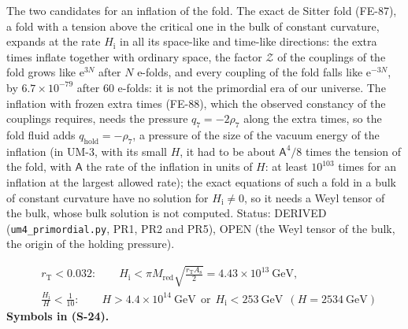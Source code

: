 \documentclass[
  10pt,
]{article}
\begin{document}
The two candidates for an inflation of the fold. The exact de Sitter
fold (FE-87), a fold with a tension above the critical one in the bulk
of constant curvature, expands at the rate \(H_{\mathrm{i}}\) in all its
space-like and time-like directions: the extra times inflate together
with ordinary space, the factor \(\mathcal{Z}\) of the couplings of the
fold grows like \(\mathrm{e}^{3N}\) after \(N\) e-folds, and every
coupling of the fold falls like \(\mathrm{e}^{-3N}\), by
\(6.7\times10^{-79}\) after 60 e-folds: it is not the primordial era of
our universe. The inflation with frozen extra times (FE-88), which the
observed constancy of the couplings requires, needs the pressure
\(q_7 = -2\rho_7\) along the extra times, so the fold fluid adds
\(q_{\mathrm{hold}} = -\rho_7\), a pressure of the size of the vacuum
energy of the inflation (in UM-3, with its small \(H\), it had to be
about \(\mathsf{A}^4/8\) times the tension of the fold, with
\(\mathsf{A}\) the rate of the inflation in units of \(H\): at least
\(10^{103}\) times for an inflation at the largest allowed rate); the
exact equations of such a fold in a bulk of constant curvature have no
solution for \(H_{\mathrm{i}} \ne 0\), so it needs a Weyl tensor of the
bulk, whose bulk solution is not computed. Status: DERIVED
(\texttt{um4\_primordial.py}, PR1, PR2 and PR5), OPEN (the Weyl tensor
of the bulk, the origin of the holding pressure).

\[
\begin{aligned}
&r_{\mathrm{T}} < 0.032:\qquad H_{\mathrm{i}} < \pi M_{\mathrm{red}}\sqrt{\frac{r_{\mathrm{T}}A_{\mathrm{s}}}{2}} = 4.43\times10^{13}\ \text{GeV},\\
&\frac{H_{\mathrm{i}}}{H} < \frac{1}{10}:\qquad H > 4.4\times10^{14}\ \text{GeV}\ \ \text{or}\ \ H_{\mathrm{i}} < 253\ \text{GeV}\ \ (H = 2534\ \text{GeV})
\end{aligned} \tag{S-24}
\] \textbf{Symbols in (S-24).}
\end{document}
